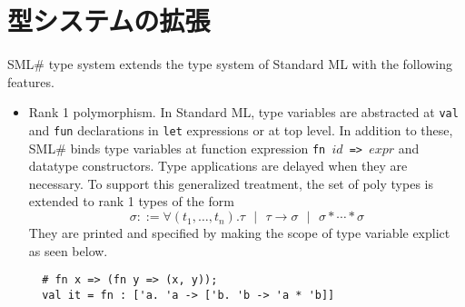 \documentclass{jbook}
\newif\ifjp
\newcommand{\txt}[2]{#1}
\newcommand{\smlsharp}{SML\#}
\newcommand{\func}{\rightarrow}
\newcommand{\vbar}{\mbox{\ $|$\ }}
\begin{document}
\fi%

\section{\txt{型システムの拡張}{Extensions to the type system}}

\ifjp%
	\smlsharp{}の型システムは，Standard MLの型システムに以下の拡張を
加えたものである．
\else%
	\smlsharp{} type system extends the type system of Standard ML
with the following features.
\fi%

\begin{itemize}
\item 
\ifjp%
	ランク１多相性．
	Standard MLでは，型変数の束縛構文は，{\tt let}式やトップレベルに
現れる{\tt val}宣言や{\tt fun}宣言であるが，\smlsharp{}では，これらに加
え，関数定義式{\tt fn $id$ => $expr$}および多相型を持つデータ型構成子を
含む．
	さらに多相型もつ識別子の型適用は，必要になるまで遅延される．
	この扱いにより，\smlsharp{}の多相型は
\[
\sigma  ::= \forall (t_1,\ldots,t_n).\tau
\vbar \tau \func \sigma 
\vbar \sigma * \cdots * \sigma
\]
の形のランク１多相型に拡張されている．
	このランク１多相型は，
\begin{verbatim}
  # fn x => (fn y => (x, y));
  val it = fn : ['a. 'a -> ['b. 'b -> 'a * 'b]]
\end{verbatim}
のように多相型変数のスコープを明示して表示され，表記される．
\else%
	Rank 1 polymorphism.
	In Standard ML, type variables are abstracted at {\tt val} and
{\tt fun} declarations in {\tt let} expressions or at top level.
	In addition to these,  \smlsharp{} binds type variables at 
function expression {\tt fn $id$ => $expr$} and datatype constructors.
	Type applications are delayed when they are necessary.
	To support this generalized treatment, the set of poly types
is extended to rank 1 types of the form
\[
\sigma  ::= \forall (t_1,\ldots,t_n).\tau
\vbar \tau \func \sigma 
\vbar \sigma * \cdots * \sigma
\]
	They are printed and specified by making the scope of 
type variable explict as seen below.
\begin{verbatim}
  # fn x => (fn y => (x, y));
  val it = fn : ['a. 'a -> ['b. 'b -> 'a * 'b]]
\end{verbatim}
\fi%


\end{itemize}
\end{document}

